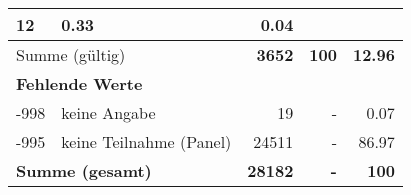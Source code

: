 \begin{longtable}{lXrrr}
       \num{12} &
       \num[round-mode=places,round-precision=2]{0,33} &
         \num[round-mode=places,round-precision=2]{0,04} \\
     \midrule
     \multicolumn{2}{l}{Summe (gültig)} &
       \textbf{\num{3652}} &
     \textbf{100} &
       \textbf{\num[round-mode=places,round-precision=2]{12,96}} \\
     \multicolumn{5}{l}{\textbf{Fehlende Werte}}\\
       -998 &
       keine Angabe &
         \num{19} &
        - &
         \num[round-mode=places,round-precision=2]{0,07} \\
       -995 &
       keine Teilnahme (Panel) &
         \num{24511} &
        - &
         \num[round-mode=places,round-precision=2]{86,97} \\
     \midrule
     \multicolumn{2}{l}{\textbf{Summe (gesamt)}} &
          \textbf{\num{28182}} &
        \textbf{-} &
        \textbf{100} \\
     \bottomrule
     \end{longtable}
     
